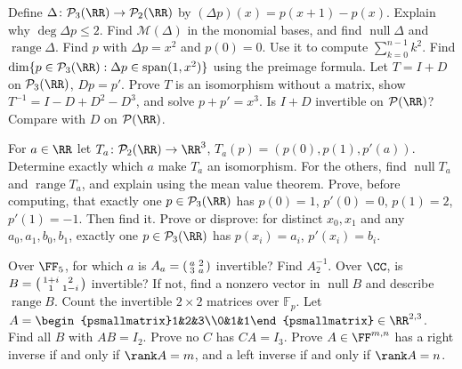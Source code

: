 \documentclass[11pt]{scrartcl}
\DeclareMathOperator{\nul}{null}
\DeclareMathOperator{\range}{range}
\DeclareMathOperator{\spn}{span}
\newcommand{\PP}{\mathcal P}
\newcommand{\MM}{\mathcal M}
\newcommand{\Fp}{\mathbb F_p}
\begin{document}
\begin{problem}
  \leavevmode
  \begin{enumerate}[(a)]
    \ii Define $\Delta\colon\PP_3(\RR)\to\PP_2(\RR)$ by $(\Delta p)(x)=p(x+1)-p(x)$.
    Explain why $\deg\Delta p\le2$.
    Find $\MM(\Delta)$ in the monomial bases, and find $\nul\Delta$ and $\range\Delta$.
    \ii Find $p$ with $\Delta p=x^2$ and $p(0)=0$. Use it to compute $\sum_{k=0}^{n-1}k^2$.
    \ii Find $\dim\{p\in\PP_3(\RR):\Delta p\in\spn(1,x^2)\}$ using the preimage formula.
    \ii Let $T=I+D$ on $\PP_3(\RR)$, $Dp=p'$.
    Prove $T$ is an isomorphism without a matrix, show $T^{-1}=I-D+D^2-D^3$, and solve $p+p'=x^3$.
    \ii Is $I+D$ invertible on $\PP(\RR)$? Compare with $D$ on $\PP(\RR)$.
  \end{enumerate}
\end{problem}

\begin{problem}
  \leavevmode
  \begin{enumerate}[(a)]
    \ii For $a\in\RR$ let $T_a\colon\PP_2(\RR)\to\RR^3$, $T_a(p)=(p(0),p(1),p'(a))$.
    Determine exactly which $a$ make $T_a$ an isomorphism.
    For the others, find $\nul T_a$ and $\range T_a$, and explain using the mean value theorem.
    \ii Prove, before computing, that exactly one $p\in\PP_3(\RR)$ has
    $p(0)=1$, $p'(0)=0$, $p(1)=2$, $p'(1)=-1$. Then find it.
    \ii Prove or disprove: for distinct $x_0,x_1$ and any $a_0,a_1,b_0,b_1$, exactly one $p\in\PP_3(\RR)$ has $p(x_i)=a_i$, $p'(x_i)=b_i$.
  \end{enumerate}
\end{problem}

\begin{problem}
  \leavevmode
  \begin{enumerate}[(a)]
    \ii Over $\FF_5$, for which $a$ is $A_a=\begin{psmallmatrix}a&2\\3&a\end{psmallmatrix}$ invertible?
    Find $A_2^{-1}$.
    \ii Over $\CC$, is $B=\begin{psmallmatrix}1+i&2\\1&1-i\end{psmallmatrix}$ invertible?
    If not, find a nonzero vector in $\nul B$ and describe $\range B$.
    \ii Count the invertible $2\times2$ matrices over $\Fp$.
    \ii Let $A=\begin{psmallmatrix}1&2&3\\0&1&1\end{psmallmatrix}\in\RR^{2,3}$.
    Find all $B$ with $AB=I_2$. Prove no $C$ has $CA=I_3$.
    \ii Prove $A\in\FF^{m,n}$ has a right inverse if and only if $\rank A=m$, and a left inverse if and only if $\rank A=n$.
  \end{enumerate}
\end{problem}
\end{document}
